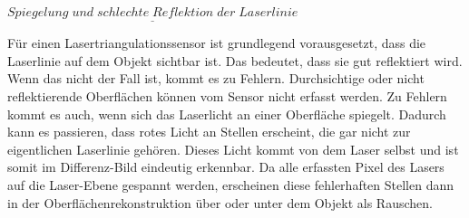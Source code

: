 		$\underline{Spiegelung \; und \; schlechte \; Reflektion \; der \; Laserlinie}$
		
		Für einen Lasertriangulationssensor ist grundlegend vorausgesetzt, dass die Laserlinie auf dem Objekt sichtbar ist. Das bedeutet, dass sie gut reflektiert wird. Wenn das nicht der Fall ist, kommt es zu Fehlern. Durchsichtige oder nicht reflektierende Oberflächen können vom Sensor nicht erfasst werden. Zu Fehlern kommt es auch, wenn sich das Laserlicht an einer Oberfläche spiegelt. Dadurch kann es passieren, dass rotes Licht an Stellen erscheint, die gar nicht zur eigentlichen Laserlinie gehören. Dieses Licht kommt von dem Laser selbst und ist somit im Differenz-Bild eindeutig erkennbar. Da alle erfassten Pixel des Lasers auf die Laser-Ebene gespannt werden, erscheinen diese fehlerhaften Stellen dann in der Oberflächenrekonstruktion über oder unter dem Objekt als Rauschen. 